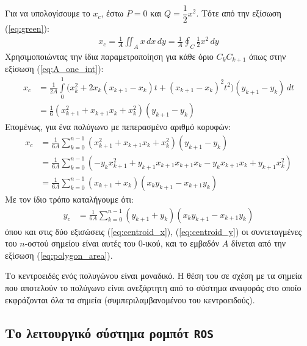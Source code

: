 Για να υπολογίσουμε το $x_c$, έστω $P = 0$ και $Q = \dfrac{1}{2}x^2$. Tότε από
την εξίσωση (\ref{eq:green}):
\begin{align}
  x_c = \frac{1}{A} \iint_A x \,dx \,dy = \frac{1}{A}\oint_C \frac{1}{2} x^2 \,dy
\end{align}
Χρησιμοποιώντας την ίδια παραμετροποίηση για κάθε όριο $C_k C_{k+1}$ όπως στην εξίσωση
(\ref{eq:A_one_int}):
\begin{align}
  x_c &= \frac{1}{2A} \int\limits_0^1 \big( x_k^2 + 2x_k (x_{k+1} - x_k)t + (x_{k+1} - x_k)^2 t^2 \big) (y_{k+1}- y_k) \,dt \nonumber \\
      &= \frac{1}{6}(x_{k+1}^2 + x_{k+1} x_k + x_k^2)(y_{k+1} - y_k) \nonumber
\end{align}
Επομένως, για ένα πολύγωνο με πεπερασμένο αριθμό κορυφών:
\begin{align}
  x_c &= \frac{1}{6A} \sum\limits_{k=0}^{n-1} (x_{k+1}^2 + x_{k+1} x_k + x_k^2)(y_{k+1} - y_k) \nonumber \\
      & = \frac{1}{6A} \sum\limits_{k=0}^{n-1} (-y_k x_{k+1}^2 + y_{k+1} x_{k+1} x_{k+1} x_k - y_k x_{k+1} x_k + y_{k+1} x_k^2) \nonumber \\
      &= \frac{1}{6A} \sum\limits_{k=0}^{n-1} (x_{k+1} + x_k) (x_k y_{k+1} - x_{k+1} y_k)
\label{eq:centroid_x}
\end{align}
Με τον ίδιο τρόπο καταλήγουμε ότι:
\begin{align}
  y_c &= \frac{1}{6A} \sum\limits_{k=0}^{n-1} (y_{k+1} + y_k) (x_k y_{k+1} - x_{k+1} y_k)
\label{eq:centroid_y}
\end{align}
όπου και στις δύο εξισώσεις (\ref{eq:centroid_x}), (\ref{eq:centroid_y}) οι
συντεταγμένες του $n$-οστού σημείου είναι αυτές του $0$-ικού, και το εμβαδόν
$A$ δίνεται από την εξίσωση (\ref{eq:polygon_area}).

\begin{gg_box}
\begin{remark}
  \label{remark:centroid_uniqueness}
  Το κεντροειδές ενός πολυγώνου είναι μοναδικό. Η θέση του σε σχέση με τα
  σημεία που αποτελούν το πολύγωνο είναι ανεξάρτητη από το σύστημα αναφοράς στο
  οποίο εκφράζονται όλα τα σημεία (συμπεριλαμβανομένου του κεντροειδούς).
\end{remark}
\end{gg_box}


\subsection{Το λειτουργικό σύστημα ρομπότ \texttt{ROS}}
\label{subsec:01_01_02_9}

